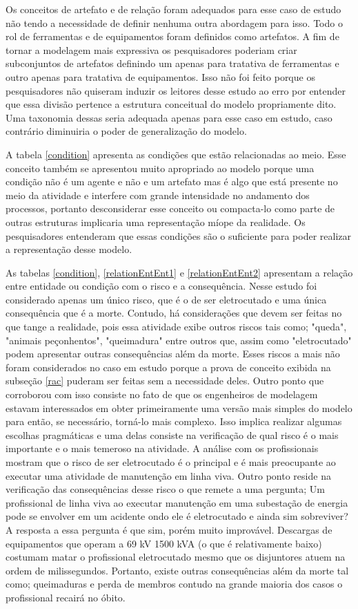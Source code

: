 Os conceitos de artefato e de relação foram adequados para esse caso de estudo não tendo a necessidade de definir nenhuma outra abordagem para isso. Todo o rol de ferramentas e de equipamentos foram definidos como artefatos. A fim de tornar a modelagem mais expressiva os pesquisadores poderiam criar subconjuntos de artefatos definindo um apenas para tratativa de ferramentas e outro 
apenas para tratativa de equipamentos. Isso não foi feito porque os pesquisadores não quiseram induzir os leitores desse estudo ao erro por entender que essa divisão pertence a estrutura conceitual do modelo propriamente dito. Uma taxonomia dessas seria adequada apenas para esse caso em estudo, caso contrário diminuiria o poder de generalização do modelo. 

A tabela \ref{condition} apresenta as condições que estão relacionadas ao meio. Esse conceito também se apresentou muito apropriado ao modelo porque uma condição não é um agente e não e um artefato mas é algo que está presente no meio da atividade e interfere com grande intensidade no andamento dos processos, portanto desconsiderar esse conceito ou compacta-lo como parte de outras estruturas 
implicaria uma representação míope da realidade. Os pesquisadores entenderam que essas condições são o suficiente para poder realizar a representação desse modelo.

As tabelas \ref{condition}, \ref{relationEntEnt1} e \ref{relationEntEnt2} apresentam a relação entre entidade ou condição com o risco e a consequência. Nesse estudo foi considerado apenas um único risco, que é o de ser eletrocutado e uma única consequência que é a morte. Contudo, há considerações que devem ser feitas no que tange a realidade, pois essa atividade exibe outros riscos tais como; "queda", "animais peçonhentos", "queimadura" entre outros que, assim como "eletrocutado" podem apresentar outras consequências além da morte. Esses riscos a mais não foram considerados no caso em estudo porque a prova de conceito exibida na subseção \ref{rac} puderam ser feitas sem a necessidade deles. Outro ponto que corroborou com isso consiste no fato de que os engenheiros de modelagem estavam interessados em obter primeiramente uma versão mais simples do modelo para então, se necessário, torná-lo mais complexo. Isso implica realizar algumas escolhas pragmáticas e uma delas consiste na verificação de qual risco é o mais importante e o mais temeroso na atividade. A análise com os profissionais mostram que o risco de 
ser eletrocutado é o principal e é mais preocupante ao executar uma atividade de manutenção em linha viva. Outro ponto reside na verificação das consequências desse risco o que remete a uma pergunta; Um profissional de linha viva ao executar manutenção em uma subestação de energia pode se envolver em um acidente ondo ele é eletrocutado e ainda sim sobreviver? A resposta a essa pergunta é que sim, porém muito improvável. Descargas de equipamentos que operam a 69 kV 1500 kVA  (o que é relativamente baixo) costumam matar o profissional eletrocutado mesmo que 
os disjuntores atuem na ordem de milissegundos. Portanto, existe outras consequências além da morte tal como; queimaduras e perda de membros contudo na grande maioria dos casos o profissional 
recairá no óbito. 

